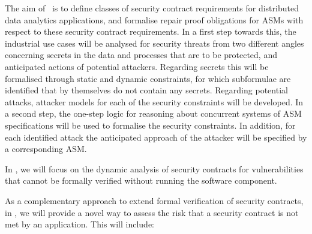 \begin{Workpackage}{\thewpno}
\begin{Task}

\TaskResults{%
}
\TaskHeader{}

The aim of \theTask\ is to define classes of security contract requirements for distributed data analytics applications, and formalise repair proof obligations for ASMs with respect to these security contract requirements. In a first step towards this, the industrial use cases will be analysed for security threats from two different angles concerning secrets in the data and processes that are to be protected, and anticipated actions of potential attackers. Regarding secrets this will be formalised through static and dynamic constraints, for which subformulae are identified that by themselves do not contain any secrets. Regarding potential attacks, attacker models for each of the security constraints will be developed. In a second step, the one-step logic for reasoning about concurrent systems of ASM specifications will be used to formalise the security constraints. In addition, for each identified attack the anticipated approach of the attacker will be specified by a corresponding ASM.
\end{Task}


\begin{Task}

\TaskResults{%
}
\TaskHeader{}

In \theTask, we will focus on the dynamic analysis of security contracts for
vulnerabilities that cannot be formally verified without running the software component.
\end{Task}



\begin{Task}

\TaskResults{%
}
\TaskHeader{}

As a complementary approach to extend formal verification of security contracts, in \theTask, we will provide a novel way to assess the risk that a security contract is not met by an application. This will include:


\end{Task}
\end{Workpackage}
